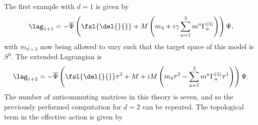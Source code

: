 The first example with $d = 1$ is given by
\begin{align*}
\lag_{1 + 1} = -\overline{\Psi}\left(\fsl{\del{}{}} + M\left(m_{4} + i\gamma\sum\limits_{a = 1}^{3}m^{a}\Gamma_{a}^{(3)}\right)\right)\Psi,
\end{align*}
with $m_{d + 3}$ now being allowed to vary such that the target space of this model is $S^{3}$. The extended Lagrangian is
\begin{align*}
\lag_{1 + 2} = -\overline{\Psi}\left(\fsl{\del{}{}}\tau^{3} + M +  iM\left(m_{4}\tau^{2} - \sum\limits_{a = 1}^{3}m^{a}\Gamma_{a}^{(3)}\tau^{1}\right)\right)\Psi.
\end{align*}
The number of anticommuting matrices in this theory is seven, and so the previously performed computation for $d = 2$ can be repeated. The topological term in the effective action is given by

